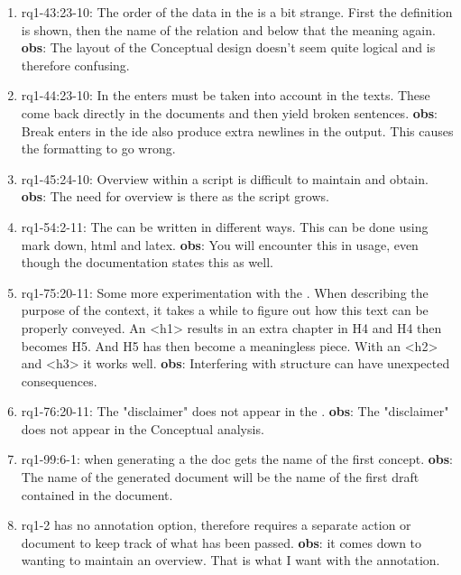 \begin{enumerate}
    \item rq1-43:23-10: The order of the data in the  is a bit strange.
    First the definition is shown, then the name of the relation and below that the meaning again.
    \newline\textbf{obs}: The layout of the Conceptual design doesn't seem quite logical and is therefore confusing.
    
    \item rq1-44:23-10: In the  enters must be taken into account in the texts.
    These come back directly in the documents and then yield broken sentences.
    \newline\textbf{obs}: Break enters in the \acrshort{ide} also produce extra newlines in the output.
    This causes the formatting to go wrong.
    
    \item rq1-45:24-10: Overview within a script is difficult to maintain and obtain.
    \newline\textbf{obs}: The need for overview is there as the script grows.
    
    \item rq1-54:2-11: The  can be written in different ways.
    This can be done using mark down, html and latex.
    \newline\textbf{obs}: You will encounter this in usage, even though the documentation states this as well.

    \item rq1-75:20-11: Some more experimentation with the .
    When describing the purpose of the context, it takes a while to figure out how this text can be properly conveyed.
    An <h1> results in an extra chapter in H4 and H4 then becomes H5. And H5 has then become a meaningless piece.
    With an <h2> and <h3> it works well.
    \newline\textbf{obs}: Interfering with structure can have unexpected consequences.
    
    \item rq1-76:20-11: The "disclaimer" does not appear in the .
    \newline\textbf{obs}: The "disclaimer" does not appear in the Conceptual analysis.
    
    \item rq1-99:6-1: when generating a  the doc gets the name of the first concept.
    \newline\textbf{obs}: The name of the generated document will be the name of the first draft contained in the document.
    
    \item rq1-2  has no annotation option, therefore requires a separate action or document to keep track of what has been passed.
    \newline\textbf{obs}: it comes down to wanting to maintain an overview. 
    That is what I want with the annotation.
    
\end{enumerate}


